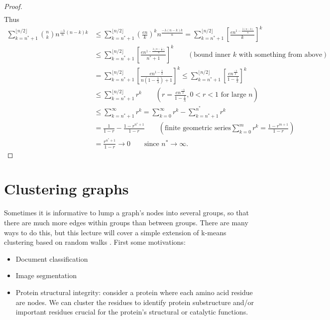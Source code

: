 \documentclass[./some_latex_template.tex]{subfiles}
\begin{document}
\begin{proof}
\begin{align*}
\end{align*}
Thus 
\begin{align*}
	\sum_{k=n^* + 1}^{\lfloor n/2 \rfloor} {n \choose k} n^{\frac{-\lambda}{n}(n-k)k} 
	&\le \sum_{k=n^* + 1}^{\lfloor n/2 \rfloor} \left(\frac{en}{k}\right)^k n^{\frac{-\lambda(n-k)k}{n}} = \sum_{k=n^* + 1}^{\lfloor n/2 \rfloor} \left[ \frac{en^{1 - \frac{\lambda(n-k)}{n}}}{k}\right]^k\\
	&\le \sum_{k=n^* + 1}^{\lfloor n/2 \rfloor} \left[ \frac{en^{1-\frac{\lambda (n - \frac{n}{2})}{n}}}{n^* + 1}\right]^k \qquad (\text{bound inner } k \text{ with something from above})\\
	&= \sum_{k=n^* + 1}^{\lfloor n/2 \rfloor} \left[\frac{en^{1 - \frac{\lambda}{2}}}{n(1 - \frac{1}{\lambda}) + 1}\right]^k \le \sum_{k=n^* + 1}^{\lfloor n/2 \rfloor} \left[\frac{en^{\frac{-\lambda}{2}}}{1 - \frac{1}{\lambda}}\right]^k\\
	&\le \sum_{k=n^* + 1}^{\lfloor n/2 \rfloor}  r^k \qquad (r = \frac{en^{\frac{-\lambda}{2}}}{1 - \frac{1}{\lambda}}, 0 < r < 1 \text{ for large }n)\\
	&\le \sum_{k=n^* + 1}^{\infty}r^k  = \sum_{k=0}^{\infty}r^k - \sum_{k=n^* + 1}^{n^*}r^k\\
	&= \frac{1}{1-r} - \frac{1-r^{n^*+1}}{1-r} \qquad (\text{finite geometric series} \sum_{k=0}^{m}r^k = \frac{1-r^{m+1}}{1-r})\\
	&= \frac{r^{n^* + 1}}{1-r} \longrightarrow 0 \qquad \text{since } n^* \rightarrow \infty.
\end{align*}
\end{proof}

\section{Clustering graphs}

Sometimes it is informative to lump a graph's nodes into several  groups, so that there are much more edges within groups than between groups. There are many ways to do this, but this lecture will cover a simple extension of k-means clustering based on random walks \cite{yen2005clustering}. First some motivations:

\begin{itemize}
	\item Document classification
	\item Image segmentation
	\item Protein structural integrity: consider a protein where each amino acid residue are nodes. We can cluster the residues to identify protein substructure and/or important residues crucial for the protein's structural or catalytic functions.  
\end{itemize}
\end{document}
